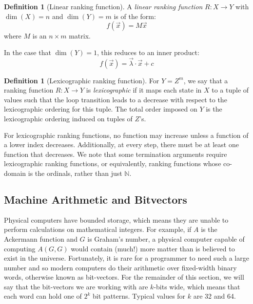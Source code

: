 \documentclass[preprint]{sigplanconf}
\theoremstyle{definition}
\newtheorem{definition}[theorem]{Definition}
\begin{document}
\begin{definition}[Linear ranking function]
A \emph{linear ranking function} $R: X \to Y$ 
with $\dim(X) = n$ and $\dim(Y) = m$ is of the form: $$f(\vec{x}) = M\vec{x}$$ where
$M$ is an $n \times m$ matrix.
\end{definition}

In the case that $\dim(Y) = 1$, this reduces to an inner product:
$$f(\vec{x}) = \vec{\lambda} \cdotp \vec{x} + c$$

\begin{definition}[Lexicographic ranking function]
For $Y = Z^m$, we say that a ranking function $R: X \to Y$ is \emph{lexicographic}
if it maps each state in $X$ to a tuple of values such that the loop transition leads to a decrease with
respect to the lexicographic ordering for this tuple.
The total order imposed on $Y$ is the lexicographic ordering
induced on tuples of $Z$'s. 
\end{definition}

For lexicographic ranking functions, no function may increase unless a function of a lower index decreases.
Additionally, at every step, there must be at least one function that decreases.
We note that some termination arguments require lexicographic ranking functions, or equivalently, ranking functions
whose co-domain is the ordinals, rather than just $\mathbb{N}$.




\subsection{Machine Arithmetic and Bitvectors} \label{sec:machine.arith} 
Physical computers have bounded storage, which means they are unable to perform calculations on mathematical
integers.  For example, if $A$ is the Ackermann function and $G$ is Graham's number, a physical computer
capable of computing $A(G, G)$ would contain (much!) more matter than is believed to exist in the universe.
Fortunately, it is rare for a programmer to need such a large number and so modern computers do their arithmetic
over fixed-width binary words, otherwise known as bit-vectors.  For the remainder of this section, we will say that
the bit-vectors we are working with are $k$-bits wide, which means that each word can hold one of $2^k$ bit patterns.
Typical values for $k$ are 32 and 64.
\end{document}

